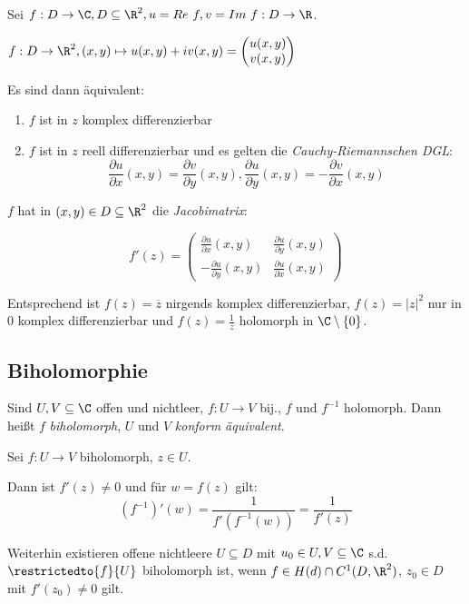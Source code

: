 Sei \(f : D \to \C, D \subseteq \R^2, u = Re \ f, v = Im \ f : D \to \R\).

\(f : D \to \R^2, (x,y) \mapsto u(x,y) + iv(x,y) = \begin{pmatrix} u(x,y) \\ v(x,y)\end{pmatrix}\)

Es sind dann äquivalent:

\begin{enumerate}[label=(\alph*)]
	\item \(f\) ist in \(z\) komplex differenzierbar
	\item \(f\) ist in \(z\) reell differenzierbar und es gelten die \emph{Cauchy-Riemannschen DGL}: \\
		\[ \frac{\partial u}{\partial x}(x,y) = \frac{\partial v}{\partial y}(x,y), \frac{\partial u}{\partial y}(x,y) = -\frac{\partial v}{\partial x}(x,y) \]
\end{enumerate}

\(f\) hat in \((x,y) \in D \subseteq \R^2\) die \emph{Jacobimatrix}:

\[ f'(z) = \begin{pmatrix}
	\frac{\partial u}{\partial x}(x,y) & \frac{\partial u}{\partial y}(x,y) \\
	-\frac{\partial u}{\partial y}(x,y) & \frac{\partial u}{\partial x}(x,y)
\end{pmatrix} \]

Entsprechend ist \(f(z)=\overline z\) nirgends komplex differenzierbar, \(f(z)=|z|^2\) nur in \(0\) komplex differenzierbar und \(f(z) = \frac{1}{z}\) holomorph in \(\C \setminus \{0\}\).

\subsection*{Biholomorphie}

Sind \(U, V \subseteq \C\) offen und nichtleer, \(f : U \to V\) bij., \(f\) und \(f^{-1}\) holomorph. Dann heißt \(f\) \emph{biholomorph}, \(U\) und \(V\) \emph{konform äquivalent}.

Sei \(f : U \to V\) biholomorph, \(z \in U\).

Dann ist \(f'(z) \neq 0\) und für \(w = f(z)\) gilt: \[ (f^{-1})'(w) = \frac{1}{f'(f^{-1}(w))} = \frac{1}{f'(z)} \]

Weiterhin existieren offene nichtleere \(U \subseteq D\) mit \(u_0 \in U, V \subseteq \C\) s.d. \(\restrictedto{f}{U}\) biholomorph ist, wenn \(f \in H(d) \cap C^1(D,\R^2)\), \(z_0 \in D\) mit \(f'(z_0) \neq 0\) gilt.

